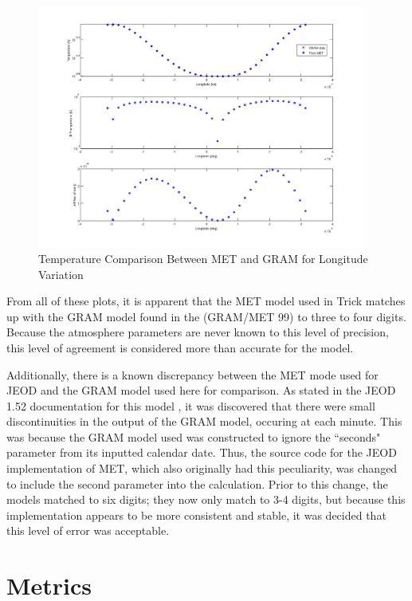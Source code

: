 \begin{description}
\begin{figure}[H]
\begin{center}
\includegraphics[height=80mm]{pics/MET_GRA_T03_temperature.jpg}
\caption{Temperature Comparison Between MET and GRAM for Longitude Variation}
\label{met_gram_lon_temp}
\end{center}
\end{figure}

From all of these plots, it is apparent that the MET model used in Trick matches
up with the GRAM model found in the (GRAM/MET 99) to three to four digits.
Because the atmosphere parameters are never known to this level of precision,
this level of agreement is considered more than accurate for the model.

Additionally, there is a known discrepancy between the MET mode used
for JEOD and the GRAM model used here for comparison. As stated in the
JEOD 1.52 documentation for this model \cite{atmosphere_15}, it was discovered
that there were small discontinuities in the output of the GRAM model, occuring
at each minute. This was because the GRAM model used was constructed to ignore
the ``seconds" parameter from its inputted calendar date. Thus, the source
code for the JEOD implementation of MET, which also originally had this
peculiarity, was changed to include the second parameter into the calculation.
Prior to this change, the models matched to six digits; they now only match
to 3-4 digits, but because this implementation appears to be more consistent
and stable, it was decided that this level of error was acceptable.
\end{description}


\section{Metrics}
